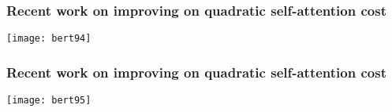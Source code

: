 \begin{frame}[fragile]\frametitle{Recent work on improving on quadratic self-attention cost}

			
			\begin{center}
			\texttt{[image: bert94]}
			\end{center}		
			

\end{frame}

\begin{frame}[fragile]\frametitle{Recent work on improving on quadratic self-attention cost}

			
			\begin{center}
			\texttt{[image: bert95]}
			\end{center}		
			

\end{frame}




